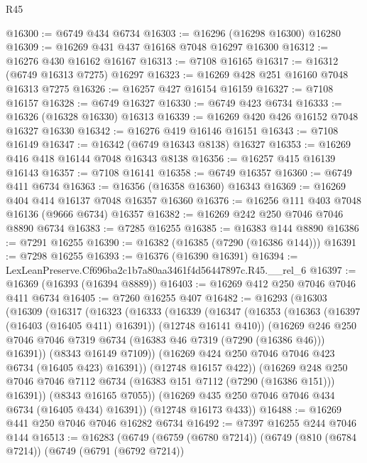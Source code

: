 \begin{lexlean}{R45}
\begin{coremodule}
{@16300 := @6749 @434 @6734
@16303 := @16296 (@16298 @16300) @16280
@16309 := @16269 @431 @437 @16168 @7048 @16297 @16300
@16312 := @16276 @430 @16162 @16167
@16313 := @7108 @16165
@16317 := @16312 (@6749 @16313 @7275) @16297
@16323 := @16269 @428 @251 @16160 @7048 @16313 @7275
@16326 := @16257 @427 @16154 @16159
@16327 := @7108 @16157
@16328 := @6749 @16327
@16330 := @6749 @423 @6734
@16333 := @16326 (@16328 @16330) @16313
@16339 := @16269 @420 @426 @16152 @7048 @16327 @16330
@16342 := @16276 @419 @16146 @16151
@16343 := @7108 @16149
@16347 := @16342 (@6749 @16343 @8138) @16327
@16353 := @16269 @416 @418 @16144 @7048 @16343 @8138
@16356 := @16257 @415 @16139 @16143
@16357 := @7108 @16141
@16358 := @6749 @16357
@16360 := @6749 @411 @6734
@16363 := @16356 (@16358 @16360) @16343
@16369 := @16269 @404 @414 @16137 @7048 @16357 @16360
@16376 := @16256 @111 @403 @7048 @16136 (@9666 @6734) @16357
@16382 := @16269 @242 @250 @7046 @7046 @8890 @6734
@16383 := @7285 @16255
@16385 := @16383 @144 @8890
@16386 := @7291 @16255
@16390 := @16382 (@16385 (@7290 (@16386 @144)))
@16391 := @7298 @16255
@16393 := @16376 (@16390 @16391)
@16394 := LexLeanPreserve.Cf696ba2c1b7a80aa3461f4d56447897c.R45.__rel_6
@16397 := @16369 (@16393 (@16394 @8889))
@16403 := @16269 @412 @250 @7046 @7046 @411 @6734
@16405 := @7260 @16255 @407
@16482 := @16293
    (@16303
      (@16309
        (@16317
          (@16323
            (@16333
              (@16339
                (@16347
                  (@16353
                    (@16363 (@16397 (@16403 (@16405 @411) @16391)) (@12748 @16141 @410))
                    (@16269
                      @246
                      @250
                      @7046
                      @7046
                      @7319
                      @6734
                      (@16383 @46 @7319 (@7290 (@16386 @46)))
                      @16391))
                  (@8343 @16149 @7109))
                (@16269 @424 @250 @7046 @7046 @423 @6734 (@16405 @423) @16391))
              (@12748 @16157 @422))
            (@16269
              @248
              @250
              @7046
              @7046
              @7112
              @6734
              (@16383 @151 @7112 (@7290 (@16386 @151)))
              @16391))
          (@8343 @16165 @7055))
        (@16269 @435 @250 @7046 @7046 @434 @6734 (@16405 @434) @16391))
      (@12748 @16173 @433))
@16488 := @16269 @441 @250 @7046 @7046 @16282 @6734
@16492 := @7397 @16255 @244 @7046 @144
@16513 := @16283
    (@6749
      (@6759 (@6780 @7214))
      (@6749
        (@810 (@6784 @7214))
        (@6749
          (@6791 (@6792 @7214))
}
\end{coremodule}
\end{lexlean}
